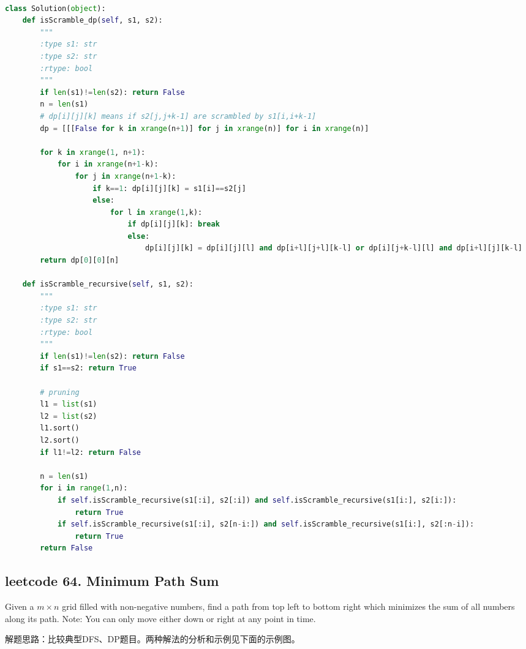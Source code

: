 \documentclass[a4paper,10pt]{article}
\begin{document}
\begin{lstlisting}[language=Python, caption=Problem87. Scramble String]

class Solution(object):
    def isScramble_dp(self, s1, s2):
        """
        :type s1: str
        :type s2: str
        :rtype: bool
        """
        if len(s1)!=len(s2): return False
        n = len(s1)
        # dp[i][j][k] means if s2[j,j+k-1] are scrambled by s1[i,i+k-1]
        dp = [[[False for k in xrange(n+1)] for j in xrange(n)] for i in xrange(n)]

        for k in xrange(1, n+1):
            for i in xrange(n+1-k):
                for j in xrange(n+1-k):
                    if k==1: dp[i][j][k] = s1[i]==s2[j]
                    else:
                        for l in xrange(1,k):
                            if dp[i][j][k]: break
                            else:
                                dp[i][j][k] = dp[i][j][l] and dp[i+l][j+l][k-l] or dp[i][j+k-l][l] and dp[i+l][j][k-l]
        return dp[0][0][n]

    def isScramble_recursive(self, s1, s2):
        """
        :type s1: str
        :type s2: str
        :rtype: bool
        """
        if len(s1)!=len(s2): return False
        if s1==s2: return True
        
        # pruning
        l1 = list(s1)
        l2 = list(s2)
        l1.sort()
        l2.sort()
        if l1!=l2: return False
        
        n = len(s1)
        for i in range(1,n):
            if self.isScramble_recursive(s1[:i], s2[:i]) and self.isScramble_recursive(s1[i:], s2[i:]):
                return True
            if self.isScramble_recursive(s1[:i], s2[n-i:]) and self.isScramble_recursive(s1[i:], s2[:n-i]):
                return True
        return False
\end{lstlisting}



\subsection{leetcode 64. Minimum Path Sum}
Given a $m \times n$ grid filled with non-negative numbers, find a path from top left to bottom right which minimizes the sum of all numbers along its path. Note: You can only move either down or right at any point in time. \\

\begin{CJK*}{UTF8}{gbsn}
\noindent 解题思路：比较典型DFS、DP题目。两种解法的分析和示例见下面的示例图。
\end{CJK*}
\end{document}
